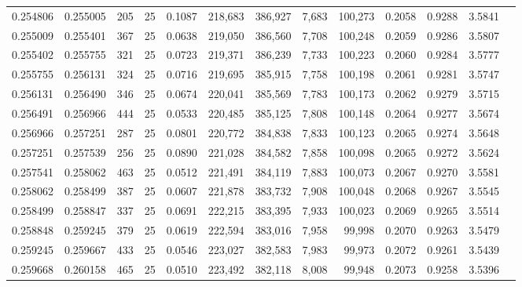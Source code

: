 \begin{tabular}{rrrrrrrrrrrrr}
0.254806 & 0.255005 &   205 &  25 &                                     0.1087 & 218,683 & 386,927 &   7,683 & 100,273 & 0.2058 & 0.9288 & 3.5841 \\
0.255009 & 0.255401 &   367 &  25 &                                     0.0638 & 219,050 & 386,560 &   7,708 & 100,248 & 0.2059 & 0.9286 & 3.5807 \\
0.255402 & 0.255755 &   321 &  25 &                                     0.0723 & 219,371 & 386,239 &   7,733 & 100,223 & 0.2060 & 0.9284 & 3.5777 \\
0.255755 & 0.256131 &   324 &  25 &                                     0.0716 & 219,695 & 385,915 &   7,758 & 100,198 & 0.2061 & 0.9281 & 3.5747 \\
0.256131 & 0.256490 &   346 &  25 &                                     0.0674 & 220,041 & 385,569 &   7,783 & 100,173 & 0.2062 & 0.9279 & 3.5715 \\
0.256491 & 0.256966 &   444 &  25 &                                     0.0533 & 220,485 & 385,125 &   7,808 & 100,148 & 0.2064 & 0.9277 & 3.5674 \\
0.256966 & 0.257251 &   287 &  25 &                                     0.0801 & 220,772 & 384,838 &   7,833 & 100,123 & 0.2065 & 0.9274 & 3.5648 \\
0.257251 & 0.257539 &   256 &  25 &                                     0.0890 & 221,028 & 384,582 &   7,858 & 100,098 & 0.2065 & 0.9272 & 3.5624 \\
0.257541 & 0.258062 &   463 &  25 &                                     0.0512 & 221,491 & 384,119 &   7,883 & 100,073 & 0.2067 & 0.9270 & 3.5581 \\
0.258062 & 0.258499 &   387 &  25 &                                     0.0607 & 221,878 & 383,732 &   7,908 & 100,048 & 0.2068 & 0.9267 & 3.5545 \\
0.258499 & 0.258847 &   337 &  25 &                                     0.0691 & 222,215 & 383,395 &   7,933 & 100,023 & 0.2069 & 0.9265 & 3.5514 \\
0.258848 & 0.259245 &   379 &  25 &                                     0.0619 & 222,594 & 383,016 &   7,958 &  99,998 & 0.2070 & 0.9263 & 3.5479 \\
0.259245 & 0.259667 &   433 &  25 &                                     0.0546 & 223,027 & 382,583 &   7,983 &  99,973 & 0.2072 & 0.9261 & 3.5439 \\
0.259668 & 0.260158 &   465 &  25 &                                     0.0510 & 223,492 & 382,118 &   8,008 &  99,948 & 0.2073 & 0.9258 & 3.5396 \\

\end{tabular}
